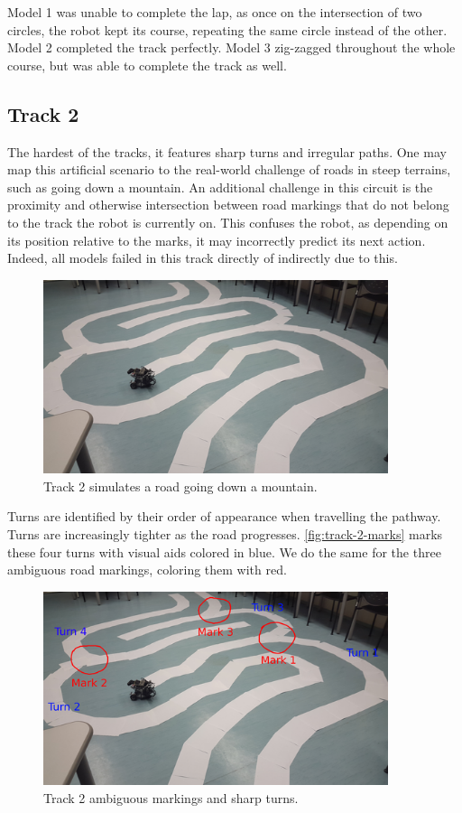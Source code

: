 Model 1 was unable to complete the lap, as once on the intersection of two circles, the robot kept
its course, repeating the same circle instead of the other. Model 2 completed the track perfectly.
Model 3 zig-zagged throughout the whole course, but was able to complete the track as well.

\subsection{Track 2}

The hardest of the tracks, it features sharp turns and irregular paths. One may map this artificial
scenario to the real-world challenge of roads in steep terrains, such as going down a mountain. An
additional challenge in this circuit is the proximity and otherwise intersection between road
markings that do not belong to the track the robot is currently on. This confuses the robot, as
depending on its position relative to the marks, it may incorrectly predict its next action.
Indeed, all models failed in this track directly of indirectly due to this.

\begin{figure}[h]
  \centering\includegraphics[width=0.9\textwidth]{imgs/track_2.png}
  \caption{Track 2 simulates a road going down a mountain.}
\end{figure}

Turns are identified by their order of appearance when travelling the pathway. Turns are
increasingly tighter as the road progresses. \autoref{fig:track-2-marks} marks these four turns
with visual aids colored in blue. We do the same for the three ambiguous road markings, coloring
them with red.

\begin{figure}[h]
  \centering\includegraphics[width=0.9\textwidth]{imgs/track_2_marks.png}
  \caption{Track 2 ambiguous markings and sharp turns.}
\end{figure}

